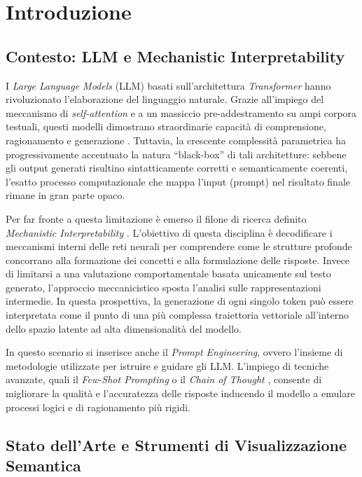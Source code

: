 \section{Introduzione}
\label{sec:introduzione}

\subsection{Contesto: LLM e Mechanistic Interpretability}
\label{sec:contesto_motivazioni}

I \textit{Large Language Models} (LLM) basati sull'architettura \textit{Transformer} \cite{vaswani2017attention} hanno rivoluzionato l'elaborazione del linguaggio naturale. Grazie all'impiego del meccanismo di \textit{self-attention} e a un massiccio pre-addestramento su ampi corpora testuali, questi modelli dimostrano straordinarie capacità di comprensione, ragionamento e generazione \cite{brown2020language}. Tuttavia, la crescente complessità parametrica ha progressivamente accentuato la natura ``black-box'' di tali architetture: sebbene gli output generati risultino sintatticamente corretti e semanticamente coerenti, l'esatto processo computazionale che mappa l'input (prompt) nel risultato finale rimane in gran parte opaco.

Per far fronte a questa limitazione è emerso il filone di ricerca definito \textit{Mechanistic Interpretability} \cite{elhage2021mathematical}. L'obiettivo di questa disciplina è decodificare i meccanismi interni delle reti neurali per comprendere come le strutture profonde concorrano alla formazione dei concetti e alla formulazione delle risposte. Invece di limitarsi a una valutazione comportamentale basata unicamente sul testo generato, l'approccio meccanicistico sposta l'analisi sulle rappresentazioni intermedie. In questa prospettiva, la generazione di ogni singolo token può essere interpretata come il punto di una più complessa traiettoria vettoriale all'interno dello spazio latente ad alta dimensionalità del modello.

In questo scenario si inserisce anche il \textit{Prompt Engineering}, ovvero l'insieme di metodologie utilizzate per istruire e guidare gli LLM. L'impiego di tecniche avanzate, quali il \textit{Few-Shot Prompting} o il \textit{Chain of Thought} \cite{wei2022chain}, consente di migliorare la qualità e l'accuratezza delle risposte inducendo il modello a emulare processi logici e di ragionamento più rigidi. 

\subsection{Stato dell'Arte e Strumenti di Visualizzazione Semantica}
\label{sec:stato_arte}

